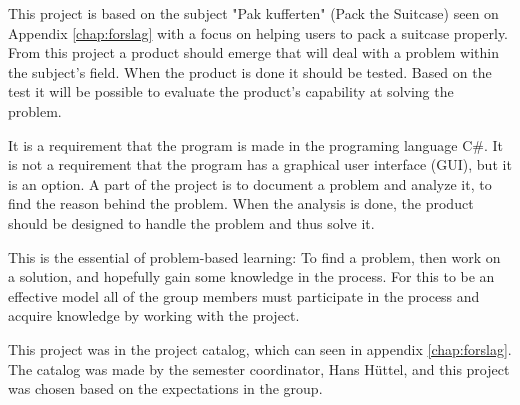 This project is based on the subject "Pak kufferten" (Pack the Suitcase) seen on Appendix \ref{chap:forslag} with a focus on helping users to pack a suitcase properly. From this project a product should emerge that will deal with a problem within the subject's field. When the product is done it should be tested. Based on the test it will be possible to evaluate the product's capability at solving the problem.

It is a requirement that the program is made in the programing language C\#. It is not a requirement that the program has a graphical user interface (GUI), but it is an option.
A part of the project is to document a problem and analyze it, to find the reason behind the problem. When the analysis is done, the product should be designed to handle the problem and thus solve it.

This is the essential of problem-based learning: To find a problem, then work on a solution, and hopefully gain some knowledge in the process.
For this to be an effective model all of the group members must participate in the process and acquire knowledge by working with the project.

This project was in the project catalog, which can seen in appendix \ref{chap:forslag}. The catalog was made by the semester coordinator, Hans Hüttel, and this project was chosen based on the expectations in the group.